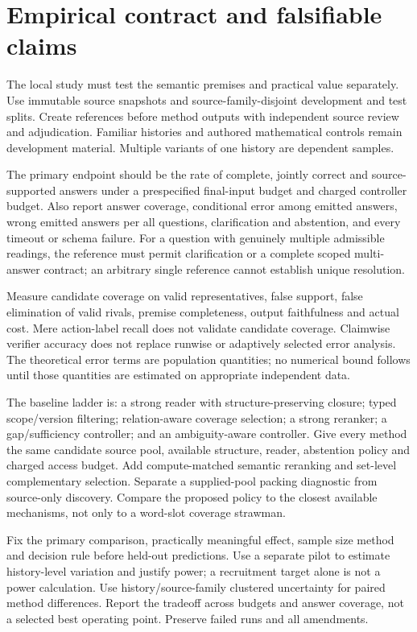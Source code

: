 \documentclass[11pt]{article}
\theoremstyle{definition}
\theoremstyle{remark}
\begin{document}
\section{Empirical contract and falsifiable claims}
\label{sec:empirical}
The local study must test the semantic premises and practical value separately.
Use immutable source snapshots and source-family-disjoint development and test
splits. Create references before method outputs with independent source review
and adjudication. Familiar histories and authored mathematical controls remain
development material. Multiple variants of one history are dependent samples.

The primary endpoint should be the rate of complete, jointly correct and
source-supported answers under a prespecified final-input budget and charged
controller budget. Also report answer coverage, conditional error among emitted
answers, wrong emitted answers per all questions, clarification and abstention,
and every timeout or schema failure. For a question with genuinely multiple
admissible readings, the reference must permit clarification or a complete
scoped multi-answer contract; an arbitrary single reference cannot establish
unique resolution.

Measure candidate coverage on valid representatives, false support, false
elimination of valid rivals, premise completeness, output faithfulness and
actual cost. Mere action-label recall does not validate candidate coverage.
Claimwise verifier accuracy does not replace runwise or adaptively selected
error analysis. The theoretical error terms are population quantities; no
numerical bound follows until those quantities are estimated on appropriate
independent data.

The baseline ladder is: a strong reader with structure-preserving closure;
typed scope/version filtering; relation-aware coverage selection; a strong
reranker; a gap/sufficiency controller; and an ambiguity-aware controller.
Give every method the same candidate source pool, available structure, reader,
abstention policy and charged access budget. Add compute-matched semantic
reranking and set-level complementary selection. Separate a supplied-pool
packing diagnostic from source-only discovery. Compare the proposed policy to
the closest available mechanisms, not only to a word-slot coverage strawman.

Fix the primary comparison, practically meaningful effect, sample size method
and decision rule before held-out predictions. Use a separate pilot to estimate
history-level variation and justify power; a recruitment target alone is not
a power calculation. Use history/source-family clustered uncertainty for paired
method differences. Report the tradeoff across budgets and answer coverage,
not a selected best operating point. Preserve failed runs and all amendments.
\end{document}

